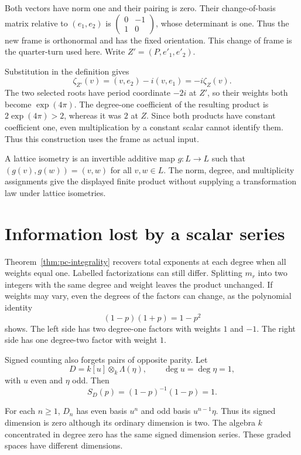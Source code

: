 Both vectors have norm one and their pairing is zero.
Their change-of-basis matrix relative to $(e_1,e_2)$ is
$\left(\begin{smallmatrix}0&-1\\1&0\end{smallmatrix}\right)$, whose
determinant is one. Thus the new frame is orthonormal and has the fixed
orientation. This change of frame is the quarter-turn used here.
Write $Z'=(P,e'_1,e'_2)$.

Substitution in the definition gives
\[
 \zeta_{Z'}(v)=(v,e_2)-i(v,e_1)=-i\zeta_Z(v).
\]
The two selected roots have period coordinate $-2i$ at $Z'$,
so their weights both become $\exp(4\pi)$.
The degree-one coefficient of the resulting product is
$2\exp(4\pi)>2$, whereas it was $2$ at $Z$.
Since both products have constant coefficient
one, even multiplication by a constant scalar cannot identify them.
Thus this construction uses the frame as actual input.

A lattice isometry is an invertible additive map $g:L\to L$ such that
$(g(v),g(w))=(v,w)$ for all $v,w\in L$.
The norm, degree, and multiplicity assignments give the displayed finite
product without supplying a transformation law under lattice isometries.

\section{Information lost by a scalar series}

Theorem~\ref{thm:pc-integrality} recovers total exponents at each degree
when all weights equal one. Labelled factorizations can still differ.
Splitting $m_r$ into two integers with the same degree and weight leaves
the product unchanged. If weights may vary, even the degrees of the
factors can change, as the polynomial identity
\[
 (1-p)(1+p)=1-p^2
\]
shows. The left side has two degree-one factors with weights $1$ and
$-1$. The right side has one degree-two factor with weight $1$.

Signed counting also forgets pairs of opposite parity.
Let
\[
 D=k[u]\otimes_k\Lambda(\eta),\qquad
 \deg u=\deg\eta=1,
\]
with $u$ even and $\eta$ odd. Then
\[
 S_D(p)=(1-p)^{-1}(1-p)=1.
\]

For each $n\geq1$, $D_n$ has even basis $u^n$ and odd basis $u^{n-1}\eta$.
Thus its signed dimension is zero although its ordinary dimension is two.
The algebra $k$ concentrated in degree zero has the same signed
dimension series. These graded spaces have different dimensions.

